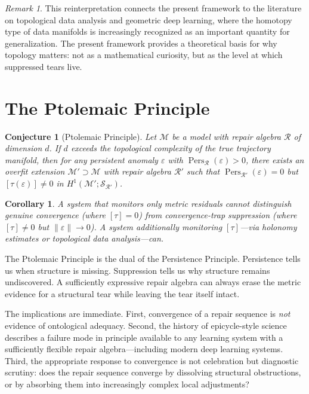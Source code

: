 \documentclass[12pt,oneside]{book}
\theoremstyle{plain}
\newtheorem{corollary}[theorem]{Corollary}
\newtheorem{conjecture}[theorem]{Conjecture}
\theoremstyle{definition}
\theoremstyle{remark}
\newtheorem{remark}[theorem]{Remark}
\DeclareMathOperator{\Pers}{Pers}
\newcommand{\R}{\mathcal{R}}
\newcommand{\M}{\mathcal{M}}
\newcommand{\eps}{\varepsilon}
\newcommand{\norm}[1]{\left\lVert #1 \right\rVert}
\newcommand{\1}{\mathbf{1}}
\begin{document}
\begin{remark}
This reinterpretation connects the present framework to the literature on topological data analysis and geometric deep learning, where the homotopy type of data manifolds is increasingly recognized as an important quantity for generalization. The present framework provides a theoretical basis for why topology matters: not as a mathematical curiosity, but as the level at which suppressed tears live.
\end{remark}

\section{The Ptolemaic Principle}

\begin{conjecture}[Ptolemaic Principle]
\label{conj:ptolemy}
Let $\M$ be a model with repair algebra $\R$ of dimension $d$. If $d$ exceeds the topological complexity of the true trajectory manifold, then for any persistent anomaly $\eps$ with $\Pers_{\R}(\eps) > 0$, there exists an overfit extension $\M' \supset \M$ with repair algebra $\R'$ such that $\Pers_{\R'}(\eps) = 0$ but $[\tau(\eps)] \neq 0$ in $H^1(\M'; \mathcal{S}_{\R'})$.
\end{conjecture}

\begin{corollary}
A system that monitors only metric residuals cannot distinguish genuine convergence (where $[\tau] = 0$) from convergence-trap suppression (where $[\tau] \neq 0$ but $\norm{\eps} \to 0$). A system additionally monitoring $[\tau]$---via holonomy estimates or topological data analysis---can.
\end{corollary}

The Ptolemaic Principle is the dual of the Persistence Principle. Persistence tells us when structure is missing. Suppression tells us why structure remains undiscovered. A sufficiently expressive repair algebra can always erase the metric evidence for a structural tear while leaving the tear itself intact.

The implications are immediate. First, convergence of a repair sequence is \emph{not} evidence of ontological adequacy. Second, the history of epicycle-style science describes a failure mode in principle available to any learning system with a sufficiently flexible repair algebra---including modern deep learning systems. Third, the appropriate response to convergence is not celebration but diagnostic scrutiny: does the repair sequence converge by dissolving structural obstructions, or by absorbing them into increasingly complex local adjustments?
\end{document}
